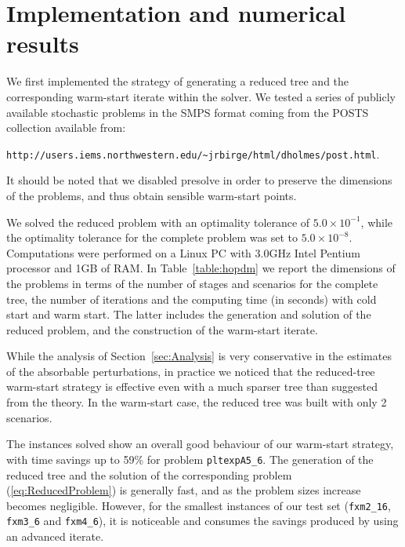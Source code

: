 %
%
\section{Implementation and numerical results}
\label{sec:Results}

We first implemented the strategy of generating a reduced tree and 
the corresponding warm-start iterate within the \HOPDM \cite{Gondzio96} 
solver. We tested a series of publicly available stochastic problems in 
the SMPS format \cite{SMPS} coming from the POSTS collection 
available from:
\begin{center}
{\tt http://users.iems.northwestern.edu/\~{}jrbirge/html/dholmes/post.html}.
\end{center}
%
%
It should be noted that we disabled presolve %
in order to preserve the dimensions of the problems, and thus obtain 
sensible warm-start points.

We solved the reduced problem with an optimality tolerance of 
$5.0\times 10^{-1}$, while the optimality tolerance for the complete 
problem was set to $5.0\times 10^{-8}$. 
Computations were performed on a Linux PC with 3.0GHz Intel Pentium 
processor and 1GB of RAM.
In Table~\ref{table:hopdm} we report the dimensions of the problems 
in terms of the number of stages and scenarios for the complete 
tree, the number of iterations and the computing time (in seconds) 
with cold start and warm start. The latter includes the generation 
and solution of the reduced problem, and the construction of the 
warm-start iterate.

While the analysis of Section~\ref{sec:Analysis} is very conservative
in the estimates of the absorbable perturbations, in practice we noticed
that the reduced-tree warm-start strategy is effective even with
a much sparser tree than suggested from the theory.
In the warm-start case, the reduced tree was built with only 2 scenarios.

The instances solved show an overall good behaviour of our warm-start
strategy, with time savings up to 59\% for problem {\tt pltexpA5\_6}.
The generation of the reduced tree and the solution of the corresponding
problem (\ref{eq:ReducedProblem}) is generally fast, and as the problem 
sizes increase becomes negligible. However, for the smallest instances
of our test set ({\tt fxm2\_16}, {\tt fxm3\_6} and {\tt fxm4\_6}), it
is noticeable and consumes the savings produced by using an advanced
iterate.

